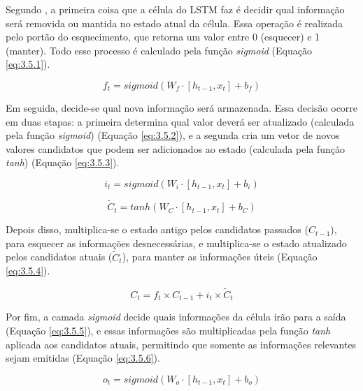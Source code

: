 Segundo \cite{tai2015}, a primeira coisa que a célula do LSTM faz é decidir qual informação será removida ou mantida no estado atual da célula. Essa operação é realizada pelo portão do esquecimento, que retorna um valor entre 0 (esquecer) e 1 (manter). Todo esse processo é calculado pela função \textit{sigmoid} (Equação \ref{eq:3.5.1}).

\begin{equation}
    f_{t} = sigmoid(W_{f} \cdot [h_{t-1}, x_{t}] + b_{f})
    \label{eq:3.5.1}
\end{equation}
 
Em seguida, decide-se qual nova informação será armazenada. Essa decisão ocorre em duas etapas: a primeira determina qual valor deverá ser atualizado (calculada pela função \textit{sigmoid}) (Equação \ref{eq:3.5.2}), e a segunda cria um vetor de novos valores candidatos que podem ser adicionados ao estado (calculada pela função \textit{tanh}) (Equação \ref{eq:3.5.3}).

\begin{equation}
    i_{t} = sigmoid(W_{i} \cdot [h_{t-1}, x_{t}] + b_{i})
    \label{eq:3.5.2}
\end{equation}

\begin{equation}
    \tilde{C}_{t} = tanh(W_{C} \cdot [h_{t-1}, x_{t}] + b_{C})
    \label{eq:3.5.3}
\end{equation}
 
Depois disso, multiplica-se o estado antigo pelos candidatos passados ($C_{t-1}$), para esquecer as informações desnecessárias, e multiplica-se o estado atualizado pelos candidatos atuais ($\tilde{C}_{t}$), para manter as informações úteis (Equação \ref{eq:3.5.4}).

\begin{equation}
    C_{t} = f_{t} \times C_{t-1} + i_{t} \times \tilde{C}_{t}
    \label{eq:3.5.4}
\end{equation}
 
Por fim, a camada \textit{sigmoid} decide quais informações da célula irão para a saída (Equação \ref{eq:3.5.5}), e essas informações são multiplicadas pela função \textit{tanh} aplicada aos candidatos atuais, permitindo que somente as informações relevantes sejam emitidas (Equação \ref{eq:3.5.6}).

\begin{equation}
    o_{t} = sigmoid(W_{o} \cdot [h_{t-1}, x_{t}] + b_{o})
    \label{eq:3.5.5}
\end{equation}


